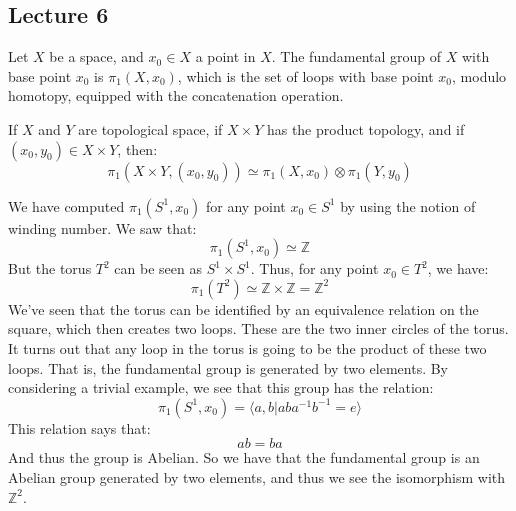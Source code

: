     \subsection{Lecture 6}
        Let $X$ be a space, and $x_{0}\in{X}$ a point in $X$.
        The fundamental group of $X$ with base point $x_{0}$
        is $\pi_{1}(X,x_{0})$, which is the set of loops with
        base point $x_{0}$, modulo homotopy, equipped with the
        concatenation operation.
        \begin{theorem}
            If $X$ and $Y$ are topological space, if
            $X\times{Y}$ has the product topology, and if
            $(x_{0},y_{0})\in{X}\times{Y}$, then:
            \begin{equation}
                \pi_{1}(X\times{Y},(x_{0},y_{0}))
                \simeq\pi_{1}(X,x_{0})\otimes\pi_{1}(Y,y_{0})
            \end{equation}
        \end{theorem}
        \begin{example}
            We have computed $\pi_{1}(S^{1},x_{0})$ for any
            point $x_{0}\in{S}^{1}$ by using the notion of
            winding number. We saw that:
            \begin{equation}
                \pi_{1}(S^{1},x_{0})\simeq\mathbb{Z}
            \end{equation}
            But the torus $T^{2}$ can be seen as
            $S^{1}\times{S}^{1}$. Thus, for any point
            $x_{0}\in{T}^{2}$, we have:
            \begin{equation}
                \pi_{1}(T^{2})\simeq
                \mathbb{Z}\times\mathbb{Z}
                =\mathbb{Z}^{2}
            \end{equation}
            We've seen that the torus can be identified by
            an equivalence relation on the square, which then
            creates two loops. These are the two inner circles
            of the torus. It turns out that any loop in the
            torus is going to be the product of these two loops.
            That is, the fundamental group is generated by
            two elements. By considering a trivial example,
            we see that this group has the relation:
            \begin{equation}
                \pi_{1}(S^{1},x_{0})=
                \langle{a,b}|aba^{-1}b^{-1}=e\rangle
            \end{equation}
            This relation says that:
            \begin{equation}
                ab=ba
            \end{equation}
            And thus the group is Abelian. So we have that
            the fundamental group is an Abelian group
            generated by two elements, and thus we see the
            isomorphism with $\mathbb{Z}^{2}$.
        \end{example}
